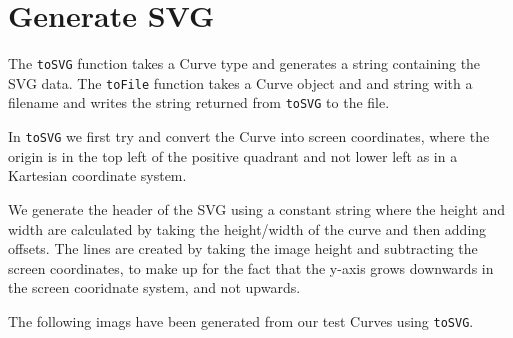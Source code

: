 \section{Generate SVG}
The \texttt{toSVG} function takes a Curve type and generates a string containing
the SVG data.  The \texttt{toFile} function takes a Curve object and and string
with a filename and writes the string returned from \texttt{toSVG} to the file.

In \texttt{toSVG} we first try and convert the Curve into screen coordinates,
where the origin is in the top left of the positive quadrant and not lower left
as in a Kartesian coordinate system.

We generate the header of the SVG using a constant string where the height and
width are calculated by taking the height/width of the curve and then adding
offsets. The lines are created by taking the image height and subtracting the
screen coordinates, to make up for the fact that the y-axis grows downwards in
the screen cooridnate system, and not upwards.

The following imags have been generated from our test Curves using
\texttt{toSVG}.

 

